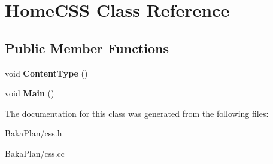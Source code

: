 \hypertarget{classHomeCSS}{\section{Home\-C\-S\-S Class Reference}
\label{classHomeCSS}
}
\subsection*{Public Member Functions}
\begin{DoxyCompactItemize}
\item 
\hypertarget{classHomeCSS_a7b0aa561a4b4aee682b9e51d64db1602}{void {\bfseries Content\-Type} ()}\label{classHomeCSS_a7b0aa561a4b4aee682b9e51d64db1602}

\item 
\hypertarget{classHomeCSS_a6b79a31efcc541dd383218288272d6d6}{void {\bfseries Main} ()}\label{classHomeCSS_a6b79a31efcc541dd383218288272d6d6}

\end{DoxyCompactItemize}


The documentation for this class was generated from the following files\-:\begin{DoxyCompactItemize}
\item 
Baka\-Plan/css.\-h\item 
Baka\-Plan/css.\-cc\end{DoxyCompactItemize}
